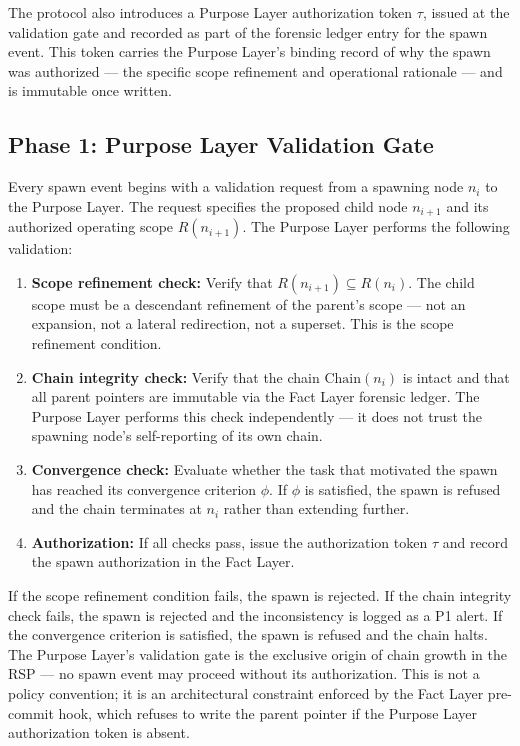 The protocol also introduces a Purpose Layer authorization token $\tau$, issued at the validation gate and recorded as part of the forensic ledger entry for the spawn event. This token carries the Purpose Layer's binding record of why the spawn was authorized — the specific scope refinement and operational rationale — and is immutable once written.

\subsection{Phase 1: Purpose Layer Validation Gate}

Every spawn event begins with a validation request from a spawning node $n_i$ to the Purpose Layer. The request specifies the proposed child node $n_{i+1}$ and its authorized operating scope $R(n_{i+1})$. The Purpose Layer performs the following validation:

\begin{enumerate}
  \item \textbf{Scope refinement check:} Verify that $R(n_{i+1}) \subseteq R(n_i)$. The child scope must be a descendant refinement of the parent's scope — not an expansion, not a lateral redirection, not a superset. This is the scope refinement condition.
  \item \textbf{Chain integrity check:} Verify that the chain $\mathrm{Chain}(n_i)$ is intact and that all parent pointers are immutable via the Fact Layer forensic ledger. The Purpose Layer performs this check independently — it does not trust the spawning node's self-reporting of its own chain.
  \item \textbf{Convergence check:} Evaluate whether the task that motivated the spawn has reached its convergence criterion $\phi$. If $\phi$ is satisfied, the spawn is refused and the chain terminates at $n_i$ rather than extending further.
  \item \textbf{Authorization:} If all checks pass, issue the authorization token $\tau$ and record the spawn authorization in the Fact Layer.
\end{enumerate}

If the scope refinement condition fails, the spawn is rejected. If the chain integrity check fails, the spawn is rejected and the inconsistency is logged as a P1 alert. If the convergence criterion is satisfied, the spawn is refused and the chain halts. The Purpose Layer's validation gate is the exclusive origin of chain growth in the RSP — no spawn event may proceed without its authorization. This is not a policy convention; it is an architectural constraint enforced by the Fact Layer pre-commit hook, which refuses to write the parent pointer if the Purpose Layer authorization token is absent.

